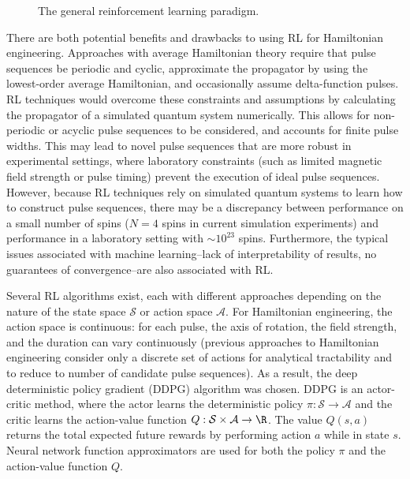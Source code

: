 \documentclass{article}
\begin{document}
\begin{figure}[ht]
    \centering
    \caption{The general reinforcement learning paradigm.}
    \label{fig:RL}
\end{figure}

There are both potential benefits and drawbacks to using RL for Hamiltonian engineering. Approaches with average Hamiltonian theory require that pulse sequences be periodic and cyclic, approximate the propagator by using the lowest-order average Hamiltonian, and occasionally assume delta-function pulses. RL techniques would overcome these constraints and assumptions by calculating the propagator of a simulated quantum system numerically. This allows for non-periodic or acyclic pulse sequences to be considered, and accounts for finite pulse widths.
This may lead to novel pulse sequences that are more robust in experimental settings, where laboratory constraints (such as limited magnetic field strength or pulse timing) prevent the execution of ideal pulse sequences.
However, because RL techniques rely on simulated quantum systems to learn how to construct pulse sequences, there may be a discrepancy between performance on a small number of spins ($N=4$ spins in current simulation experiments) and performance in a laboratory setting with $\sim10^{23}$ spins. Furthermore, the typical issues associated with machine learning--lack of interpretability of results, no guarantees of convergence--are also associated with RL.

Several RL algorithms exist, each with different approaches depending on the nature of the state space $\mathcal{S}$ or action space $\mathcal{A}$. For Hamiltonian engineering, the action space is continuous: for each pulse, the axis of rotation, the field strength, and the duration can vary continuously (previous approaches to Hamiltonian engineering consider only a discrete set of actions for analytical tractability and to reduce to number of candidate pulse sequences). As a result, the deep deterministic policy gradient (DDPG) algorithm\cite{lillicrap2015continuous} was chosen.
DDPG is an actor-critic method, where the actor learns the deterministic policy $\pi: \mathcal{S} \to \mathcal{A}$ and the critic learns the action-value function $Q: \mathcal{S} \times \mathcal{A} \to \R$. The value $Q(s,a)$ returns the total expected future rewards by performing action $a$ while in state $s$. Neural network function approximators are used for both the policy $\pi$ and the action-value function $Q$.
\end{document}
